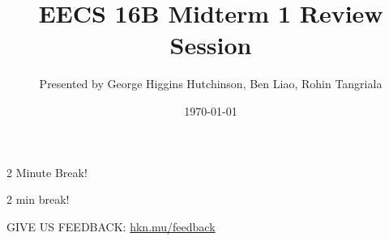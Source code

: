 

\title{EECS 16B Midterm 1 Review Session}
\author{Presented by George Higgins Hutchinson, Ben Liao, Rohin Tangriala}
\date{\today}

\newcommand{\SlideAccessingLogistics}{\@691}










\begin{frame}
    2 Minute Break!
\end{frame}



	\begin{frame}
	    2 min break!

        GIVE US FEEDBACK: \url{hkn.mu/feedback}
	\end{frame}


	


